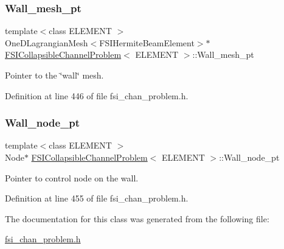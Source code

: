 \subsubsection{\texorpdfstring{Wall\+\_\+mesh\+\_\+pt}{Wall\_mesh\_pt}}
{\footnotesize\ttfamily template$<$class E\+L\+E\+M\+E\+NT $>$ \\
One\+D\+Lagrangian\+Mesh$<$F\+S\+I\+Hermite\+Beam\+Element$>$$\ast$ \hyperlink{classFSICollapsibleChannelProblem}{F\+S\+I\+Collapsible\+Channel\+Problem}$<$ E\+L\+E\+M\+E\+NT $>$\+::Wall\+\_\+mesh\+\_\+pt\hspace{0.3cm}{\ttfamily [protected]}}



Pointer to the \char`\"{}wall\char`\"{} mesh. 



Definition at line 446 of file fsi\+\_\+chan\+\_\+problem.\+h.

\mbox{\label{classFSICollapsibleChannelProblem_a377285ce93d55b9c6035737796da1bbf}} 
\subsubsection{\texorpdfstring{Wall\+\_\+node\+\_\+pt}{Wall\_node\_pt}}
{\footnotesize\ttfamily template$<$class E\+L\+E\+M\+E\+NT $>$ \\
Node$\ast$ \hyperlink{classFSICollapsibleChannelProblem}{F\+S\+I\+Collapsible\+Channel\+Problem}$<$ E\+L\+E\+M\+E\+NT $>$\+::Wall\+\_\+node\+\_\+pt\hspace{0.3cm}{\ttfamily [protected]}}



Pointer to control node on the wall. 



Definition at line 455 of file fsi\+\_\+chan\+\_\+problem.\+h.



The documentation for this class was generated from the following file\+:\begin{DoxyCompactItemize}
\item 
\hyperlink{fsi__chan__problem_8h}{fsi\+\_\+chan\+\_\+problem.\+h}\end{DoxyCompactItemize}
